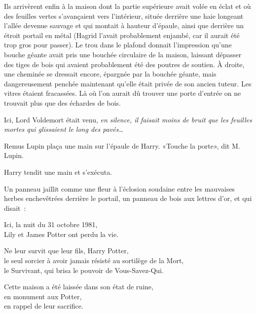 Ils arrivèrent enfin à la maison dont la partie supérieure avait volée en éclat et où des feuilles vertes s'avançaient vers l'intérieur, située derrière une haie longeant l'allée devenue sauvage et qui montait à hauteur d'épaule, ainsi que derrière un étroit portail en métal (Hagrid l'avait probablement enjambé, car il aurait été trop gros pour passer). Le trou dans le plafond donnait l'impression qu'une bouche géante avait pris une bouchée circulaire de la maison, laissant dépasser des tiges de bois qui avaient probablement été des poutres de soutien. À droite, une cheminée se dressait encore, épargnée par la bouchée géante, mais dangereusement penchée maintenant qu'elle était privée de son ancien tuteur. Les vitres étaient fracassées. Là où l'on aurait dû trouver une porte d'entrée on ne trouvait plus que des échardes de bois.

Ici, Lord Voldemort était venu, \emph{en silence, il faisait moins de bruit que les feuilles mortes qui glissaient le long des pavés…}

Remus Lupin plaça une main sur l'épaule de Harry. «Touche la porte», dit M. Lupin.

Harry tendit une main et s'exécuta.

Un panneau jaillit comme une fleur à l'éclosion soudaine entre les mauvaises herbes enchevêtrées derrière le portail, un panneau de bois aux lettres d'or, et qui disait~:
\begin{center}
Ici, la nuit du 31 octobre 1981,\\
Lily et James Potter ont perdu la vie.

Ne leur survit que leur fils, Harry Potter,\\
le seul sorcier à avoir jamais résisté au sortilège de la Mort,\\
le Survivant, qui brisa le pouvoir de Vous-Savez-Qui.

Cette maison a été laissée dans son état de ruine,\\
en monument aux Potter,\\
en rappel de leur sacrifice.
\end{center}

